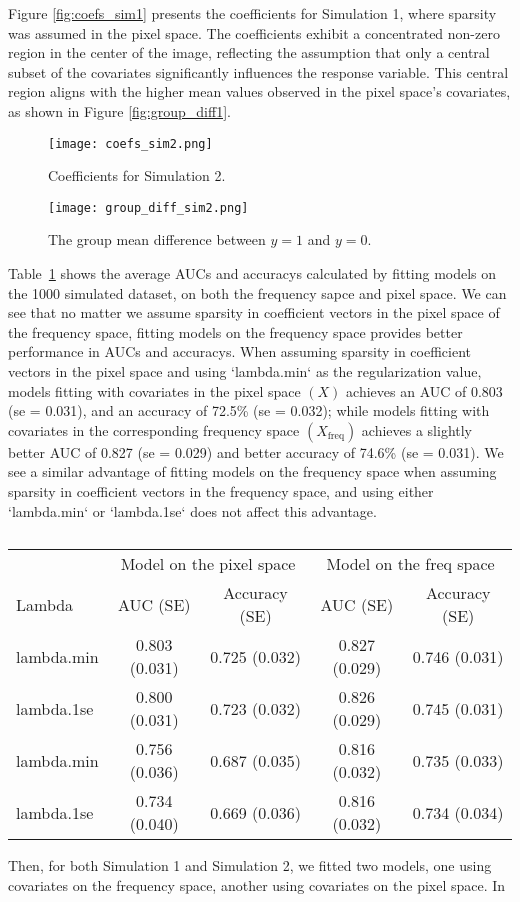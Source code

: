 \documentclass[12pt]{article}
\begin{document}
Figure \ref{fig:coefs_sim1} presents the coefficients for Simulation 1, where
sparsity was assumed in the pixel space. The coefficients exhibit a
concentrated non-zero region in the center of the image, reflecting the
assumption that only a central subset of the covariates significantly
influences the response variable. This central region aligns with the higher
mean values observed in the pixel space's covariates, as shown in Figure
\ref{fig:group_diff1}.


\begin{figure}[h!]
	\centering
	\texttt{[image: coefs\_sim2.png]}
  \caption{Coefficients for Simulation 2.}
  \label{fig:coefs_sim2}
\end{figure}

\begin{figure}[h!]
	\centering
	\texttt{[image: group\_diff\_sim2.png]}
	\caption{The group mean difference between \( y = 1 \) and \( y = 0 \).}
	\label{fig:group_diff2}
\end{figure}

Table~\ref*{tab:auc_acc_table} shows the average AUCs and accuracys calculated
by fitting models on the 1000 simulated dataset, on both the frequency sapce
and pixel space. We can see that no matter we assume sparsity in coefficient
vectors in the pixel space of the frequency space, fitting models on the
frequency space provides better performance in AUCs and accuracys. When
assuming sparsity in coefficient vectors in the pixel space and using
`lambda.min` as the regularization value, models fitting with covariates in
the pixel space \( (X) \) achieves an AUC of 0.803 (se = 0.031), and an
accuracy of 72.5\% (se = 0.032); while models fitting with covariates in the
corresponding frequency space \( (X_{\text{freq}}) \) achieves a slightly
better AUC of 0.827 (se = 0.029) and better accuracy of 74.6\% (se = 0.031).
We see a similar advantage of fitting models on the frequency space when
assuming sparsity in coefficient vectors in the frequency space, and using
either `lambda.min` or `lambda.1se` does not affect this advantage.

\begin{table}[h!]
\centering
\caption{}
\label{tab:auc_acc_table}
\begin{tabular}{l|cc|cc}
\toprule
& \multicolumn{2}{c}{Model on the pixel space} & \multicolumn{2}{c}{Model on the freq space} \\ 
	Lambda & AUC (SE) & Accuracy (SE) & AUC (SE) & Accuracy (SE) \\ 
\midrule
	lambda.min & 0.803 (0.031) & 0.725 (0.032) & 0.827 (0.029) & 0.746 (0.031) \\
	lambda.1se & 0.800 (0.031) & 0.723 (0.032) & 0.826 (0.029) & 0.745 (0.031) \\ 
	lambda.min & 0.756 (0.036) & 0.687 (0.035) & 0.816 (0.032) & 0.735 (0.033)  \\
	lambda.1se & 0.734 (0.040) & 0.669 (0.036) & 0.816 (0.032) & 0.734 (0.034) \\
\bottomrule
\end{tabular}
\end{table}

Then, for both Simulation 1 and Simulation 2, we fitted two models, one using
covariates on the frequency space, another using covariates on the pixel
space. In 
\end{document}
